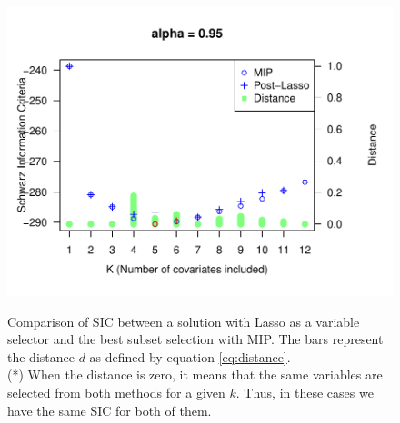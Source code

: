 \begin{figure}
\begin{minipage}[t]{0.4\linewidth}
\begin{minipage}[b]{\linewidth}
			\centering     \includegraphics[width=\textwidth]{Figuras/SIC095.pdf}
			\label{fig:npqar-cross}
		\end{minipage}
	\end{minipage}
	\caption{Comparison of SIC between a solution with Lasso as a variable selector and the best subset selection with MIP. The bars represent the distance $d$ as defined by equation \ref{eq:distance}. \\ (*) When the distance is zero, it means that the same variables are selected from both methods for a given $k$. Thus, in these cases we have the same SIC for both of them.}
	\label{fig:comparison-lm-results}
\end{figure}


